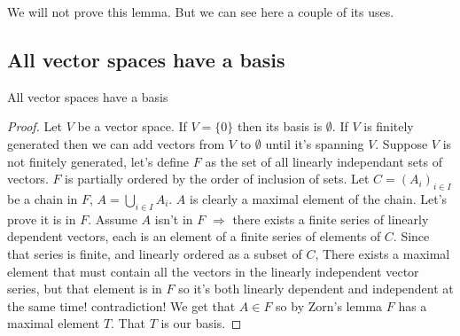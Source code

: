 \documentclass[11pt,a4paper]{article}
\begin{document}
We will not prove this lemma.
But we can see here a couple of its uses.

\subsection{All vector spaces have a basis}
\begin{proposition}
  All vector spaces have a basis
\end{proposition}
\begin{proof}
Let $V$ be a vector space. If $V=\{0\}$ then its basis is $\emptyset$.
If $V$ is finitely generated then we can add vectors from $V$ to 
$\emptyset$ until it's spanning $V$.
Suppose $V$ is not finitely generated, let's define $F$ as the set 
of all linearly independant sets of vectors.
$F$ is partially ordered by the order of inclusion of sets.
Let $C=(A_i)_{i\in I}$ be a chain in $F$, $A=\bigcup_{i\in I}A_i$. 
$A$ is clearly a maximal element of the chain. Let's prove it is in $F$.
Assume $A$ isn't in $F$ $\Rightarrow$ there exists a finite series of 
linearly dependent vectors, each is an element of a finite series of 
elements of $C$. Since that series is finite, and linearly ordered as 
a subset of $C$, There exists a maximal element that must contain 
all the vectors in the linearly independent vector series, but that 
element is in $F$ so it's both linearly dependent and independent at 
the same time! contradiction! We get that $A\in F$ so by Zorn's 
lemma $F$ has a maximal element $T$. That $T$ is our basis.
\end{proof}
\end{document}

